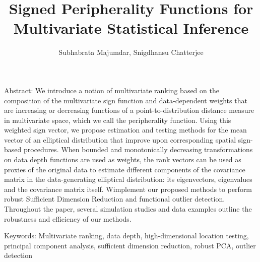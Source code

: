 \documentclass[11pt,letterpaper]{article}
\numberwithin{equation}{section}
\begin{document}
\newtheorem{Theorem}{Theorem}[section]
\newtheorem{Lemma}[Theorem]{Lemma}
\newtheorem{Corollary}[Theorem]{Corollary}
\newtheorem{Proposition}[Theorem]{Proposition}
\newtheorem{Conjecture}[Theorem]{Conjecture}
\theoremstyle{definition} \newtheorem{Definition}[Theorem]{Definition}

\title{Signed Peripherality Functions for Multivariate Statistical Inference}
\date{}
\author{Subhabrata Majumdar, Snigdhansu Chatterjee}
\maketitle

Abstract:
We introduce a notion of multivariate ranking based on the composition of the multivariate sign function and data-dependent weights that are increasing or decreasing functions of a point-to-distribution distance measure in multivariate space, which we call the peripherality function. Using this weighted sign vector, we propose estimation and testing methods for the mean vector of an elliptical distribution that improve upon corresponding spatial sign-based procedures. When bounded and monotonically decreasing transformations on data depth functions are used as weights, the rank vectors can be used as proxies of the original data to estimate different components of the covariance matrix in the data-generating elliptical distribution: its eigenvectors, eigenvalues and the covariance matrix itself. Wimplement our proposed methods to perform robust Sufficient Dimension Reduction \citep{AdragniCook09} and functional outlier detection. Throughout the paper, several simulation studies and data examples outline the robustness and efficiency of our methods.
\vspace{.5cm}

Keywords:
Multivariate ranking, data depth, high-dimensional location testing, principal component analysis, sufficient dimension reduction, robust PCA, outlier detection

\newpage









%



\end{document}
